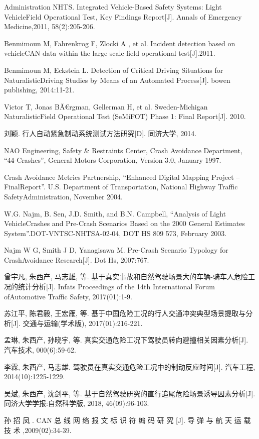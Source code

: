 Administration NHTS. Integrated Vehicle-Based Safety Systems: Light VehicleField Operational Test, Key Findings Report[J]. Annals of Emergency Medicine,2011, 58(2):205-206.

Benmimoun M, Fahrenkrog F, Zlocki A , et al. Incident detection based on vehicleCAN-data within the large scale field operational test[J].2011.

Benmimoun M, Eckstein L. Detection of Critical Driving Situations for NaturalisticDriving Studies by Means of an Automated Process[J]. bowen publishing, 2014:11-21.

Victor T, Jonas BÃ€rgman, Gellerman H, et al. Sweden-Michigan NaturalisticField Operational Test (SeMiFOT) Phase 1: Final Report[J]. 2010.

刘颖. 行人自动紧急制动系统测试方法研究[D]. 同济大学, 2014.

NAO Engineering, Safety \& Restraints Center, Crash Avoidance Department, “44-Crashes”, General Motors Corporation, Version 3.0, January 1997.

Crash Avoidance Metrics Partnership, “Enhanced Digital Mapping Project – FinalReport”. U.S. Department of Transportation, National Highway Traffic SafetyAdministration, November 2004.

W.G. Najm, B. Sen, J.D. Smith, and B.N. Campbell, “Analysis of Light VehicleCrashes and Pre-Crash Scenarios Based on the 2000 General Estimates System”.DOT-VNTSC-NHTSA-02-04, DOT HS 809 573, February 2003.

Najm W G, Smith J D, Yanagisawa M. Pre-Crash Scenario Typology for CrashAvoidance Research[J]. Dot Hs, 2007:767.

曾宇凡, 朱西产, 马志雄, 等. 基于真实事故和自然驾驶场景大的车辆-骑车人危险工况的统计分析[J]. Infats Proceedings of the 14th International Forum ofAutomotive Traffic Safety, 2017(01):1-9.

苏江平, 陈君毅, 王宏雁, 等. 基于中国危险工况的行人交通冲突典型场景提取与分析[J]. 交通与运输(学术版), 2017(01):216-221.

孟琳, 朱西产, 孙晓宇, 等. 真实交通危险工况下驾驶员转向避撞相关因素分析[J]. 汽车技术, 000(6):59-62.

李霖, 朱西产, 马志雄. 驾驶员在真实交通危险工况中的制动反应时间[J]. 汽车工程, 2014(10):1225-1229.

吴斌, 朱西产, 沈剑平, 等. 基于自然驾驶研究的直行追尾危险场景诱导因素分析[J]. 同济大学学报:自然科学版, 2018, 46(09):96-103.

孙 招 凤 . CAN 总 线 网 络 报 文 标 识 符 编 码 研 究 [J]. 导 弹 与 航 天 运 载 技 术 ,2009(02):34-39.

